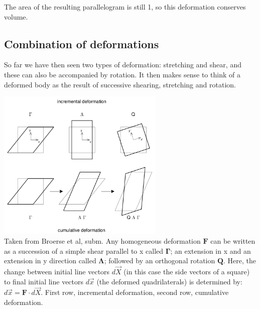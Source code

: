 \begin{center}
\end{center}

The area of the resulting parallelogram is still 1, so this deformation conserves volume.

 


\subsection*{Combination of deformations}

So far we have then seen two types of deformation: stretching and shear, and these
can also be accompanied by rotation. 
It then makes sense to think of a deformed body as the result of successive 
shearing, stretching and rotation. 


\begin{center}
\includegraphics[width=8cm]{python_codes/fieldstone_89/images/broerse}\\
{\captionfont Taken from Broerse et al, subm.
Any homogeneous deformation ${\bm F}$ can be written as a succession of a simple shear
parallel to x called ${\bm \Gamma}$; an extension in x and an extension in y direction called
${\bm \Lambda}$; followed by an orthogonal rotation ${\bm Q}$. 
Here, the change between initial line vectors $d\vec{X}$ (in this case
the side vectors of a square) to final initial line vectors $d\vec{x}$ (the deformed quadrilaterals) is
determined by: $d\vec{x} = {\bm F} \cdot d\vec{X}$. 
First row, incremental deformation, second row, cumulative deformation.
}
\end{center}


